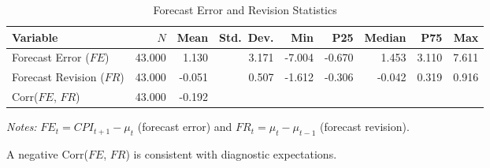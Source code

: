 \begin{table}[!htbp]
\centering
\small
\caption{Forecast Error and Revision Statistics}
\label{tab:fe_fr}
\begin{threeparttable}
    \begin{tabular}{@{}lrrrrrrrr@{}}
        \toprule
        Variable & $N$ & Mean & Std.\ Dev. & Min & P25 & Median & P75 & Max \\
        \midrule
        Forecast Error ($FE$) & 43.000 & 1.130 & 3.171 & -7.004 & -0.670 & 1.453 & 3.110 & 7.611 \\
        Forecast Revision ($FR$) & 43.000 & -0.051 & 0.507 & -1.612 & -0.306 & -0.042 & 0.319 & 0.916 \\
        \addlinespace
        Corr($FE$, $FR$) & 43.000 & -0.192 &  &  &  &  &  &  \\
        \bottomrule
    \end{tabular}
    \begin{tablenotes}[flushleft]
        \footnotesize
        \item \textit{Notes:} $FE_t = CPI_{t+1} - \mu_t$ (forecast error) and $FR_t = \mu_t - \mu_{t-1}$ (forecast revision).
        \item A negative Corr($FE$, $FR$) is consistent with diagnostic expectations.
    \end{tablenotes}
\end{threeparttable}
\end{table}

